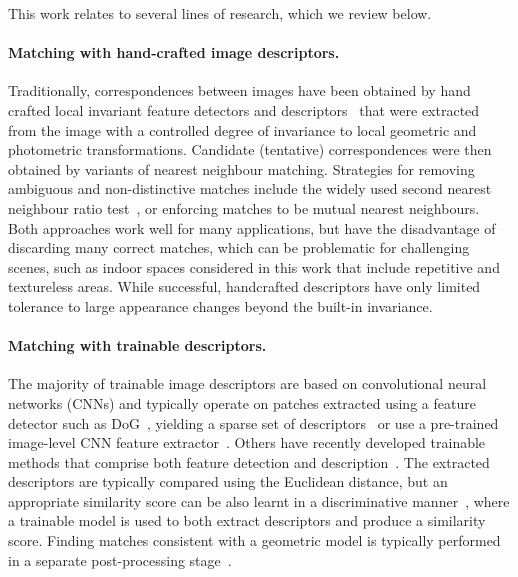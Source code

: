 \documentclass{article}
\begin{document}
This work relates to several lines of research, which we review below. 


\paragraph{Matching with hand-crafted image descriptors.}
Traditionally, correspondences between images have been obtained by hand crafted local invariant feature detectors and descriptors~\cite{lowe2004distinctive,mikolajczyk2002affine,Tuytelaars08} that were extracted from the image with a controlled degree of invariance to local geometric and photometric transformations. Candidate (tentative) correspondences were then obtained by variants of nearest neighbour matching. Strategies for removing ambiguous and non-distinctive matches include the widely used second nearest neighbour ratio test~\cite{lowe2004distinctive}, or enforcing matches to be mutual nearest neighbours. Both  approaches work well for many applications, but have the disadvantage of discarding many correct matches, which can be problematic for challenging scenes, such as indoor spaces considered in this work that include repetitive and textureless areas. While successful, handcrafted descriptors have only limited tolerance to large appearance changes beyond the built-in invariance. 


\paragraph{Matching with trainable descriptors.}
The majority of trainable image descriptors are based on convolutional neural networks (CNNs) and typically operate on patches extracted using a feature detector such as DoG~\cite{lowe2004distinctive}, yielding a sparse set of descriptors~\cite{jahrer2008learned, fischer2014descriptor, balntas2016pn, ConvOpt,DeepDesc,TFeat} or use a pre-trained image-level CNN feature extractor~\cite{noh2017large,Savinov17}. Others have recently developed trainable methods that comprise both feature detection and description~\cite{yi2016lift,choy_nips16,noh2017large}.
The extracted descriptors are typically compared using the Euclidean distance, but an appropriate similarity score can be also learnt in a discriminative manner~\cite{zagoruyko2015learning, han2015matchnet}, where a trainable model is used to both extract descriptors and produce a similarity score. Finding matches consistent with a geometric model is typically performed in a separate post-processing stage~\cite{long2014convnets,jahrer2008learned, fischer2014descriptor, balntas2016pn, ConvOpt,DeepDesc,TFeat,yi2016lift,choy_nips16,noh2017large}.
\end{document}
